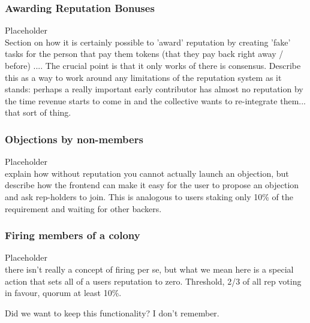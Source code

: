 \subsubsection{Awarding Reputation Bonuses}

%
Placeholder\\
Section on how it is certainly possible to 'award' reputation by creating 'fake' tasks for the person that pay them tokens (that they pay back right away / before) ....
The crucial point is that it only works of there is consensus.
Describe this as a way to work around any limitations of the reputation system as it stands: perhaps a really important early contributor has almost no reputation by the time revenue starts to come in and the collective wants to re-integrate them... that sort of thing.
%

\subsubsection{Objections by non-members}
%
Placeholder\\
explain how without reputation you cannot actually launch an objection, but describe how the frontend can make it easy for the user to propose an objection and ask rep-holders to join. This is analogous to users staking only 10\% of the requirement and waiting for other backers.
%

\subsubsection{Firing members of a colony}

%
Placeholder\\
there isn't really a concept of firing per se, but what we mean here is a special action that sets all of a users reputation to zero.
Threshold, 2/3 of all rep voting in favour, quorum at least 10\%. 
%

Did we want to keep this functionality? I don't remember.

